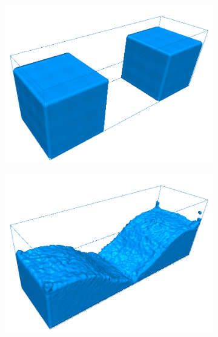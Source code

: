 \begin{figure}[h!]
    \captionsetup{justification=centering}
	\centering
	\begin{subfigure}[t]{.3\textwidth}
			\centering
        	\includegraphics[scale=0.65]{obrazky-figures/app/Blocks01.jpg}
	\end{subfigure}%
	\begin{subfigure}[t]{.3\textwidth}
		\centering
		\includegraphics[scale=0.65]{obrazky-figures/app/Blocks02.jpg}
	\end{subfigure}
		\begin{subfigure}[t]{.3\textwidth}
			\centering

\end{subfigure}
\end{figure}
